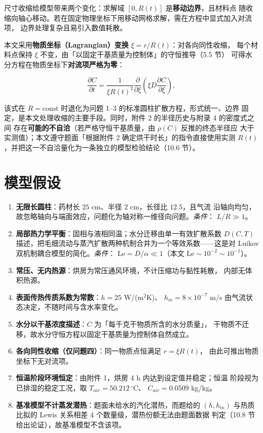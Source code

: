 尺寸收缩给模型带来两个变化：求解域 $[0,R(t)]$ 是\textbf{移动边界}，且材料点
随收缩向轴心移动。若在固定物理坐标下用移动网格求解，需在方程中显式加入对流项，
边界处理复杂且易引入数值耗散。

本文采用\textbf{物质坐标（Lagrangian）变换} $\xi=r/R(t)$：对各向同性收缩，
每个材料点保持 $\xi$ 不变，由「以固定干基质量为控制体」的守恒推导（5.5 节）
可得水分方程在物质坐标下\textbf{对流项严格为零}：

\[
\frac{\partial C}{\partial t}=\frac{1}{\xi R(t)^2}\frac{\partial}{\partial \xi}
\left(\xi D\frac{\partial C}{\partial \xi}\right),
\]

该式在 $R=\text{const}$ 时退化为问题 1--3 的标准圆柱扩散方程，形式统一、边界
固定，是本文处理收缩的主要手段。同时，附件 2 的半径历史与附录 4 的密度式之间
存在\textbf{可能的不自洽}（若严格守恒干基质量，由 $\rho(C)$ 反推的终态半径应
大于实测值）；本文遵守题面「根据附件 2 确定烘干时长」的指令直接使用实测
$R(t)$，并把这一不自洽量化为一条独立的模型检验结论（10.6 节）。

\section{模型假设}

\begin{enumerate}
  \item \textbf{无限长圆柱}：药材长 $25$ cm、半径 $2$ cm，长径比 $12.5$，且气流
  沿轴向均匀，故忽略轴向与端面效应，问题化为轴对称一维径向问题。\textit{条件}：
  $L/R\gg1$。
    \item \textbf{局部热力学平衡}：固相与液相同温；水分迁移由单一有效扩散系数
  $D(C,T)$ 描述，把毛细流动与蒸汽扩散两种机制合并为一个等效系数——这是对
  Luikov 双机制耦合模型的简化\cite{luikov1966}。\textit{条件}：
  $\mathrm{Le}=D/\alpha\ll1$（本文 $\mathrm{Le}\sim10^{-2}\!\sim\!10^{-1}$）。
\item \textbf{常压、无内热源}：烘房为常压通风环境，不计压缩功与黏性耗散，
  内部无体积热源。
  \item \textbf{表面传热传质系数为常数}：$h=25$ W/(m$^2$K)、
  $h_m=8\times10^{-7}$ m/s 由气流状态决定，不随时间与含水率变化。
  \item \textbf{水分以干基浓度描述}：$C$ 为「每千克干物质所含的水分质量」，
  干物质不迁移，故水分守恒方程以固定干基质量为控制体自然成立。
  \item \textbf{各向同性收缩（仅问题四）}：同一物质点恒满足 $r=\xi R(t)$，
  由此可推出物质坐标下无对流项。
  \item \textbf{恒温阶段环境恒定}：由附件 1，烘房 4 h 内达到设定值并稳定；恒温
  阶段视为已排湿的稳定工况，取 $T_{air}=50.212\,^\circ$C、
  $C_{air}=0.0509$ kg/kg。
  \item \textbf{基准模型不计蒸发潜热}：题面未给水的汽化潜热，而题给的
  $(h,h_m)$ 与热质比拟的 Lewis 关系相差 4 个数量级，潜热份额无法由题面数据
  判定（10.8 节给出论证），故基准模型不含该项。
\end{enumerate}

